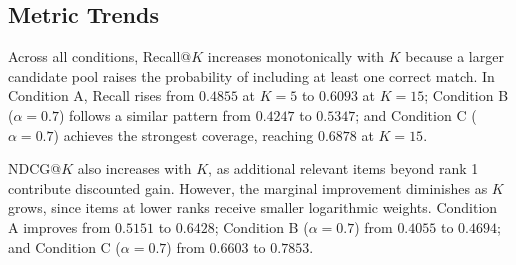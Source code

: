 \documentclass[12pt,a4paper]{article}
\begin{document}
\begin{table}[H]
\centering
\caption{mAP@K results (mean $\pm$ std, 3 seeds).}
\label{tab:map}
\end{table}


\subsection{Metric Trends}

Across all conditions, Recall@$K$ increases monotonically with $K$ because a
larger candidate pool raises the probability of including at least one correct
match. In Condition A, Recall rises from $0.4855$ at $K{=}5$ to $0.6093$ at
$K{=}15$; Condition B ($\alpha{=}0.7$) follows a similar pattern from $0.4247$
to $0.5347$; and Condition C ($\alpha{=}0.7$) achieves the strongest coverage,
reaching $0.6878$ at $K{=}15$.

NDCG@$K$ also increases with $K$, as additional relevant items beyond rank 1
contribute discounted gain. However, the marginal improvement diminishes as $K$
grows, since items at lower ranks receive smaller logarithmic weights. Condition
A improves from $0.5151$ to $0.6428$; Condition B ($\alpha{=}0.7$) from
$0.4055$ to $0.4694$; and Condition C ($\alpha{=}0.7$) from $0.6603$ to
$0.7853$.
\end{document}
